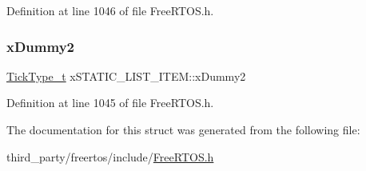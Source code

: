 Definition at line 1046 of file Free\+R\+T\+O\+S.\+h.

\mbox{\label{structxSTATIC__LIST__ITEM_a902f5a362987a85e76338f233e16817e}} 
\subsubsection{\texorpdfstring{x\+Dummy2}{xDummy2}}
{\footnotesize\ttfamily \hyperlink{pic32mx_2portmacro_8h_aa69c48c6e902ce54f70886e6573c92a9}{Tick\+Type\+\_\+t} x\+S\+T\+A\+T\+I\+C\+\_\+\+L\+I\+S\+T\+\_\+\+I\+T\+E\+M\+::x\+Dummy2}



Definition at line 1045 of file Free\+R\+T\+O\+S.\+h.



The documentation for this struct was generated from the following file\+:\begin{DoxyCompactItemize}
\item 
third\+\_\+party/freertos/include/\hyperlink{FreeRTOS_8h}{Free\+R\+T\+O\+S.\+h}\end{DoxyCompactItemize}
